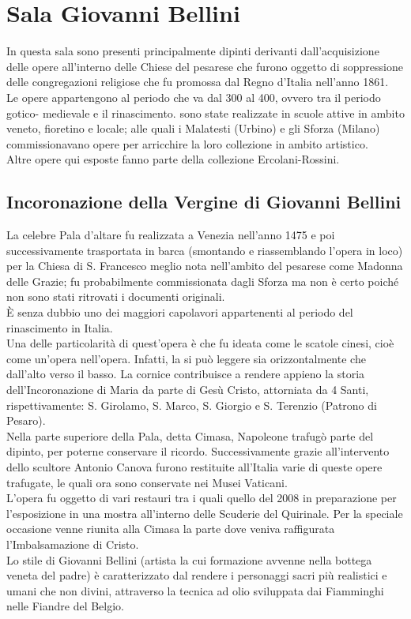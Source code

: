 \documentclass[12pt,a4paper]{article}
\begin{document}
	\section{Sala Giovanni Bellini}
	In questa sala sono presenti principalmente dipinti derivanti dall'acquisizione delle opere all'interno delle Chiese del pesarese che furono oggetto di soppressione delle congregazioni religiose che fu promossa dal Regno d'Italia nell'anno 1861.\\
	Le opere appartengono al periodo che va dal  300 al 400, ovvero tra il periodo gotico- medievale e il rinascimento. sono state realizzate in scuole attive in ambito veneto, fioretino e locale; alle quali i Malatesti (Urbino) e gli Sforza (Milano) commissionavano opere per arricchire la loro collezione in ambito artistico.\\
	Altre opere qui esposte fanno parte della collezione Ercolani-Rossini.
	
	\subsection{Incoronazione della Vergine di Giovanni Bellini}
	La celebre Pala d'altare fu realizzata a Venezia nell'anno 1475 e poi successivamente trasportata in barca (smontando e riassemblando l'opera in loco) per la Chiesa di S. Francesco meglio nota nell'ambito del pesarese come Madonna delle Grazie; fu probabilmente commissionata dagli Sforza ma non è certo poiché non sono stati ritrovati i documenti originali.\\
	È senza dubbio uno dei maggiori capolavori appartenenti al periodo del rinascimento in Italia.\\
	Una delle particolarità di quest'opera è che fu ideata come le scatole cinesi, cioè come un’opera nell'opera. Infatti, la si può leggere sia orizzontalmente che dall'alto verso il basso. La cornice contribuisce a rendere appieno la storia dell'Incoronazione di Maria da parte di Gesù Cristo, attorniata da 4 Santi, rispettivamente: S. Girolamo, S. Marco, S. Giorgio e S. Terenzio (Patrono di Pesaro). \\
	Nella parte superiore della Pala, detta Cimasa, Napoleone trafugò parte del dipinto, per poterne conservare il ricordo. Successivamente grazie all'intervento dello scultore Antonio Canova furono restituite all'Italia varie di queste opere trafugate, le quali ora sono conservate nei Musei Vaticani.\\
	L'opera fu oggetto di vari restauri tra i quali quello del 2008 in preparazione per l'esposizione in una mostra all'interno delle Scuderie del Quirinale. Per la speciale occasione venne riunita alla Cimasa la parte dove veniva raffigurata l’Imbalsamazione di Cristo.\\
	Lo stile di Giovanni Bellini (artista la cui formazione avvenne nella bottega veneta del padre)  è caratterizzato dal rendere i personaggi sacri più realistici e umani che non divini, attraverso la tecnica ad olio sviluppata dai Fiamminghi nelle Fiandre del Belgio.
	
\end{document}
